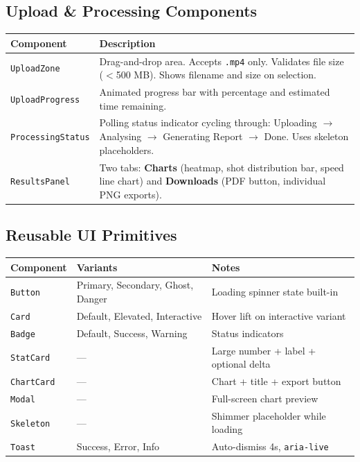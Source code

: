 \documentclass[12pt,a4paper]{article}
\begin{document}
\subsection{Upload \& Processing Components}

\begin{tabular}{lp{8.8cm}}
\toprule
\textbf{Component} & \textbf{Description} \\
\midrule
\texttt{UploadZone}       & Drag-and-drop area. Accepts \texttt{.mp4} only. Validates file size ($<$500 MB). Shows filename and size on selection. \\
\texttt{UploadProgress}   & Animated progress bar with percentage and estimated time remaining. \\
\texttt{ProcessingStatus} & Polling status indicator cycling through: Uploading $\to$ Analysing $\to$ Generating Report $\to$ Done. Uses skeleton placeholders. \\
\texttt{ResultsPanel}     & Two tabs: \textbf{Charts} (heatmap, shot distribution bar, speed line chart) and \textbf{Downloads} (PDF button, individual PNG exports). \\
\bottomrule
\end{tabular}

\subsection{Reusable UI Primitives}

\begin{tabular}{lll}
\toprule
\textbf{Component} & \textbf{Variants} & \textbf{Notes} \\
\midrule
\texttt{Button}    & Primary, Secondary, Ghost, Danger & Loading spinner state built-in \\
\texttt{Card}      & Default, Elevated, Interactive     & Hover lift on interactive variant \\
\texttt{Badge}     & Default, Success, Warning           & Status indicators \\
\texttt{StatCard}  & —                                   & Large number + label + optional delta \\
\texttt{ChartCard} & —                                   & Chart + title + export button \\
\texttt{Modal}     & —                                   & Full-screen chart preview \\
\texttt{Skeleton}  & —                                   & Shimmer placeholder while loading \\
\texttt{Toast}     & Success, Error, Info                & Auto-dismiss 4s, \texttt{aria-live} \\
\bottomrule
\end{tabular}
\end{document}
